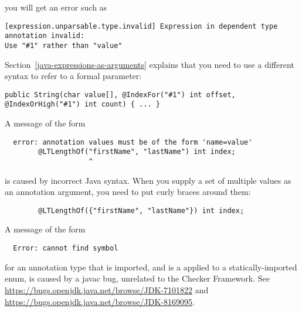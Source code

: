 \begin{itemize}
\noindent
you will get an error such as

\begin{smaller}
\begin{Verbatim}[]
[expression.unparsable.type.invalid] Expression in dependent type annotation invalid:
Use "#1" rather than "value"
\end{Verbatim}
\end{smaller}

Section~\ref{java-expressions-as-arguments} explains that you need to use
a different syntax to refer to a formal parameter:

\begin{smaller}
\begin{Verbatim}
public String(char value[], @IndexFor("#1") int offset, @IndexOrHigh("#1") int count) { ... }
\end{Verbatim}
\end{smaller}


\end{itemize}



A message of the form

\begin{Verbatim}
  error: annotation values must be of the form 'name=value'
        @LTLengthOf("firstName", "lastName") int index;
                    ^
\end{Verbatim}

\noindent
is caused by incorrect Java syntax.  When you supply a set of multiple
values as an annotation argument, you need to put curly braces around them:

\begin{Verbatim}
        @LTLengthOf({"firstName", "lastName"}) int index;
\end{Verbatim}

A message of the form

\begin{Verbatim}
  Error: cannot find symbol
\end{Verbatim}

\noindent
for an annotation type that is imported, and is a applied to a
statically-imported enum, is caused by a javac bug, unrelated to the
Checker Framework.  See
\url{https://bugs.openjdk.java.net/browse/JDK-7101822} and \url{https://bugs.openjdk.java.net/browse/JDK-8169095}.


